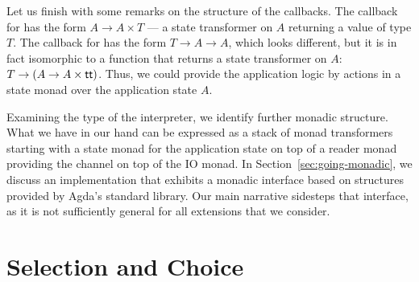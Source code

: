 \documentclass[acmsmall,screen]{acmart}
\begin{document}
Let us finish with some remarks on the structure of the callbacks. The
callback for {\ACSEND} has the form $A \to A \times T$ --- a state
transformer on $A$ returning a value of type $T$. The callback for
{\ACRECV} has the form $T \to A \to A$, which looks different, but it
is in fact isomorphic to a function that returns a state transformer
on $A$:
$T \to (A \to A \times \Att)$. Thus, we could provide the
application logic by actions in a state monad over the application
state $A$.

Examining the type of the interpreter, we identify further monadic
structure. What we have in our hand can be expressed as a stack of monad transformers starting with a state
monad for the application state on top of a reader monad providing the
channel on top of the IO monad. In Section~\ref{sec:going-monadic},
we discuss an implementation that exhibits a monadic interface based
on structures provided by Agda's standard library.
Our main narrative sidesteps that interface, as it is not sufficiently
general for all extensions that we consider.

\section{Selection and Choice}
\label{sec:select-choice}
\end{document}
